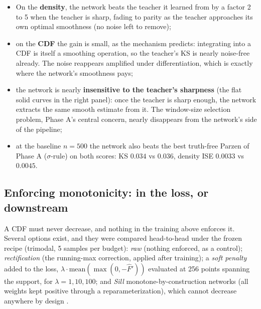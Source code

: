 \documentclass[11pt]{article}
\newcommand{\Fhat}{\widehat{F}}
\begin{document}
\begin{itemize}
  \item On the \textbf{density}, the network beats the teacher it learned from by a factor
        2 to 5 when the teacher is sharp, fading to parity as the teacher approaches its
        own optimal smoothness (no noise left to remove);
  \item on the \textbf{CDF} the gain is small, as the mechanism predicts: integrating into
        a CDF is itself a smoothing operation, so the teacher's KS is nearly noise-free
        already. The noise reappears amplified under differentiation, which is exactly
        where the network's smoothness pays;
  \item the network is nearly \textbf{insensitive to the teacher's sharpness} (the flat
        solid curves in the right panel): once the teacher is sharp enough, the network
        extracts the same smooth estimate from it. The window-size selection problem,
        Phase A's central concern, nearly disappears from the network's side of the
        pipeline;
  \item at the baseline $n = 500$ the network also beats the best truth-free Parzen of
        Phase A ($\sigma$-rule) on both scores: KS $0.034$ vs $0.036$, density ISE
        $0.0033$ vs $0.0045$.
\end{itemize}

\subsection{Enforcing monotonicity: in the loss, or downstream}
\label{sec:mono}

A CDF must never decrease, and nothing in the training above enforces it. Several options
exist, and they were compared head-to-head under the frozen recipe (trimodal, 5 samples per
budget): \emph{raw} (nothing enforced, as a control); \emph{rectification} (the running-max
correction, applied after training); a \emph{soft penalty} added to the loss,
$\lambda \cdot \mathrm{mean}(\max(0, -\Fhat'))$ evaluated at 256 points spanning the
support, for $\lambda = 1, 10, 100$; and \emph{Sill} monotone-by-construction networks
(all weights kept positive through a reparameterization), which cannot decrease anywhere by
design \cite{sill1998}.
\end{document}
